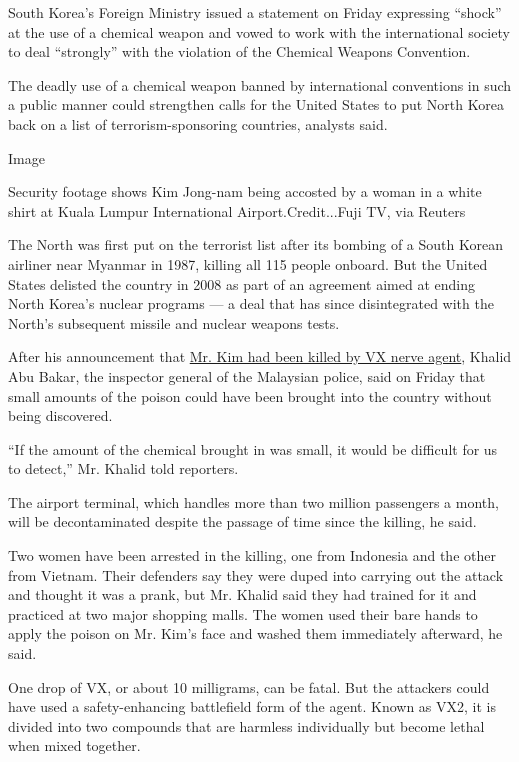 South Korea's Foreign Ministry issued a statement on Friday expressing
``shock'' at the use of a chemical weapon and vowed to work with the
international society to deal ``strongly'' with the violation of the
Chemical Weapons Convention.

The deadly use of a chemical weapon banned by international conventions
in such a public manner could strengthen calls for the United States to
put North Korea back on a list of terrorism-sponsoring countries,
analysts said.

Image

Security footage shows Kim Jong-nam being accosted by a woman in a white
shirt at Kuala Lumpur International Airport.Credit...Fuji TV, via
Reuters

The North was first put on the terrorist list after its bombing of a
South Korean airliner near Myanmar in 1987, killing all 115 people
onboard. But the United States delisted the country in 2008 as part of
an agreement aimed at ending North Korea's nuclear programs --- a deal
that has since disintegrated with the North's subsequent missile and
nuclear weapons tests.

After his announcement that
\href{https://www.nytimes3xbfgragh.onion/2017/02/23/world/asia/kim-jong-nam-vx-nerve-agent-.html?rref=collection\%2Fsectioncollection\%2Fasia\&action=click\&contentCollection=asia\&region=stream\&module=stream_unit\&version=latest\&contentPlacement=7\&pgtype=sectionfront}{Mr.
Kim had been killed by VX nerve agent}, Khalid Abu Bakar, the inspector
general of the Malaysian police, said on Friday that small amounts of
the poison could have been brought into the country without being
discovered.

``If the amount of the chemical brought in was small, it would be
difficult for us to detect,'' Mr. Khalid told reporters.

The airport terminal, which handles more than two million passengers a
month, will be decontaminated despite the passage of time since the
killing, he said.

Two women have been arrested in the killing, one from Indonesia and the
other from Vietnam. Their defenders say they were duped into carrying
out the attack and thought it was a prank, but Mr. Khalid said they had
trained for it and practiced at two major shopping malls. The women used
their bare hands to apply the poison on Mr. Kim's face and washed them
immediately afterward, he said.

One drop of VX, or about 10 milligrams, can be fatal. But the attackers
could have used a safety-enhancing battlefield form of the agent. Known
as VX2, it is divided into two compounds that are harmless individually
but become lethal when mixed together.

